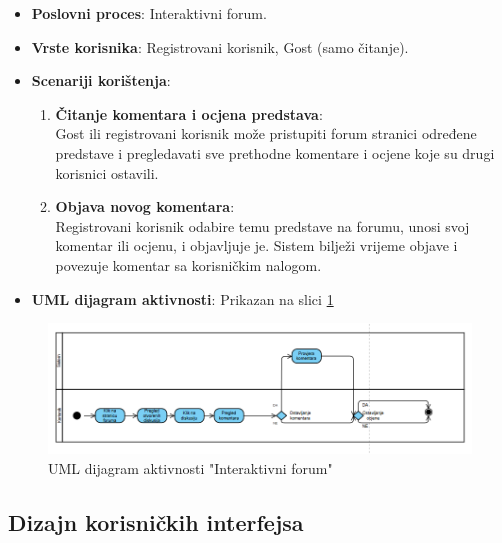 \begin{itemize}
    \item \textbf{Poslovni proces}: Interaktivni forum.
    \item \textbf{Vrste korisnika}: Registrovani korisnik, Gost (samo čitanje).
    \item \textbf{Scenariji korištenja}:
    \begin{enumerate}
        \item \textbf{Čitanje komentara i ocjena predstava}: \\
        Gost ili registrovani korisnik može pristupiti forum stranici određene predstave i pregledavati sve prethodne komentare i ocjene koje su drugi korisnici ostavili.
        
        \item \textbf{Objava novog komentara}: \\
        Registrovani korisnik odabire temu predstave na forumu, unosi svoj komentar ili ocjenu, i objavljuje je. Sistem bilježi vrijeme objave i povezuje komentar sa korisničkim nalogom.
    \end{enumerate}
    \item \textbf{UML dijagram aktivnosti}: Prikazan na slici \ref{fig:fz4}
\end{itemize}

\begin{figure}[H]
    \centering
    \includegraphics[width=1\textwidth]{Slike/Fz4.png}
    \caption{UML dijagram aktivnosti "Interaktivni forum"}
    \label{fig:fz4}
\end{figure}

\sloppy

\subsection{Dizajn korisničkih interfejsa}

